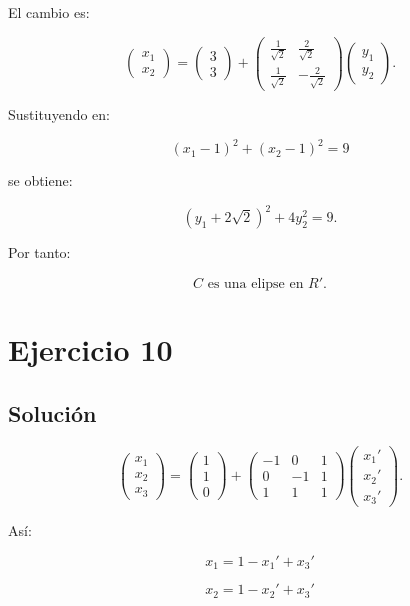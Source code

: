 \documentclass[11pt,a4paper]{article}
\begin{document}
El cambio es:

\[
\begin{pmatrix}
x_1\\x_2
\end{pmatrix}
=
\begin{pmatrix}
3\\3
\end{pmatrix}
+
\begin{pmatrix}
\frac1{\sqrt2}&\frac2{\sqrt2}\\
\frac1{\sqrt2}&-\frac2{\sqrt2}
\end{pmatrix}
\begin{pmatrix}
y_1\\y_2
\end{pmatrix}.
\]

Sustituyendo en:

\[
(x_1-1)^2+(x_2-1)^2=9
\]

se obtiene:

\[
\boxed{
(y_1+2\sqrt2)^2+4y_2^2=9.
}
\]

Por tanto:

\[
\boxed{
C\text{ es una elipse en }R'.
}
\]

\section{Ejercicio 10}
\subsection{Solución}

\[
\begin{pmatrix}
x_1\\x_2\\x_3
\end{pmatrix}
=
\begin{pmatrix}
1\\1\\0
\end{pmatrix}
+
\begin{pmatrix}
-1&0&1\\
0&-1&1\\
1&1&1
\end{pmatrix}
\begin{pmatrix}
x_1'\\x_2'\\x_3'
\end{pmatrix}.
\]

Así:

\[
x_1=1-x_1'+x_3'
\]

\[
x_2=1-x_2'+x_3'
\]
\end{document}
